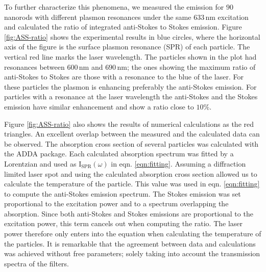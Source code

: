 \documentclass[journal=nalefd,manuscript=letter]{achemso}
\newcommand{\nm}{\ensuremath{\,\textrm{nm}}}
\begin{document}
To further characterize this phenomena, we measured the emission for $90$
nanorods with different plasmon resonances under the same $633\nm$ excitation
and calculated the ratio of integrated anti-Stokes to Stokes emission.
Figure \ref{fig:ASS-ratio} shows the experimental results in blue circles, where
the horizontal axis of the figure is the surface plasmon resonance (SPR) of each
particle. The vertical red line marks the laser wavelength. The particles shown
in the plot had resonances between $600\nm$ and $690\nm$; the ones showing the
maximum ratio of anti-Stokes to Stokes are those with a resonance to the blue of
the laser. For these particles the plasmon is enhancing preferably the
anti-Stokes emission. For particles with a resonance at the laser wavelength the
anti-Stokes and the Stokes emission have similar enhancement and show a ratio
close to $10\%$.

Figure \ref{fig:ASS-ratio} also shows the results of numerical calculations as the red
triangles. An excellent overlap between the measured and the calculated data can
be observed. The absorption cross section of several particles was calculated
with the ADDA package\cite{Yurkin2011}. Each calculated absorption spectrum was
fitted by a Lorentzian and used as $\textrm{I}_{\textrm{SPR}}(\omega)$ in eqn.
\ref{eqn:fitting}. Assuming a diffraction limited laser spot and using the
calculated absorption cross section allowed us to calculate the temperature of
the particle. This value was used in eqn. \ref{eqn:fitting} to compute the
anti-Stokes emission spectrum. The Stokes emission was set proportional to the
excitation power and to a spectrum overlapping the absorption. Since both
anti-Stokes and Stokes emissions are proportional to the excitation power, this
term cancels out when computing the ratio. The laser power therefore only enters
into the equation when calculating the temperature of the particles. It is
remarkable that the agreement between data and calculations was achieved
without free parameters; solely taking into account the transmission spectra of
the filters.
\end{document}

